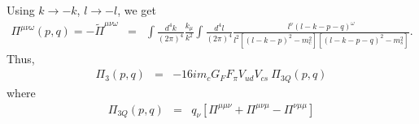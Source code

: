 \documentclass[twoside]{article}
\begin{document}
\begin{appendix}
Using $k \rightarrow - k$, $l \rightarrow - l$, we get
\begin{eqnarray}
\Pi^{\mu \nu \omega}(p,q) = - \tilde{\Pi}^{\mu \nu \omega}
&=&
\int \frac{d^4 k}{(2\pi)^4} \frac{k_\mu}{k^2}
\int \frac{d^4 l}{(2 \pi)^4}
\frac{l^\nu (l - k -p - q)^\omega}{l^2 \left[(l - k - p)^2 - m_c^2  \right] \left[  (l - k - p - q)^2 - m_s^2\right]}. \qquad
\end{eqnarray}
Thus, 
\begin{eqnarray}
\Pi_3(p,q) &=& 
-16 i m_c G_F F_\pi V_{ud} V_{cs}~ \Pi_{3Q} (p,q)
\end{eqnarray}
where
\begin{eqnarray}
\Pi_{3Q}(p,q)
&=&
q_\nu \left[
\Pi^{\mu \mu \nu} + \Pi^{\mu \nu \mu} - \Pi^{\nu \mu \mu}
\right]
\end{eqnarray}
\end{appendix}
\vspace{2mm}
\end{document}
